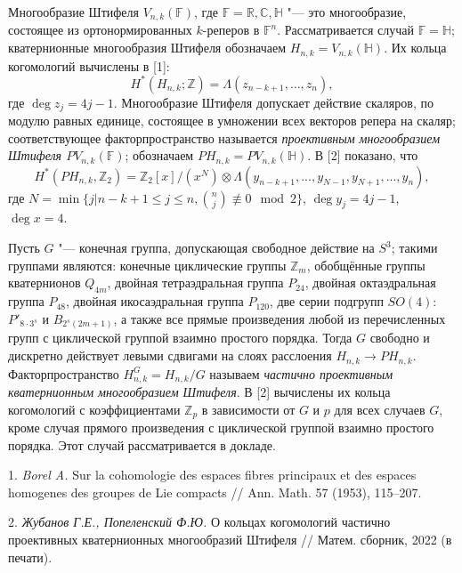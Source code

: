 
\vzmscaption

Многообразие Штифеля $V_{n,k}(\mathbb{F})$, где $\mathbb{F} = \mathbb{R}, \mathbb{C}, \mathbb{H}$ "--- это многообразие, состоящее из ортонормированных $k$-реперов в $\mathbb{F}^n$. Рассматривается случай $\mathbb{F} = \mathbb{H}$; кватернионные многообразия Штифеля обозначаем $H_{n,k} = V_{n,k}(\mathbb{H})$. Их кольца когомологий вычислены в [1]:
$$H^*(H_{n,k}; \mathbb{Z}) = \Lambda(z_{n-k+1}, \ldots, z_n),$$
где $\deg z_j = 4j - 1$. Многообразие Штифеля допускает действие скаляров, по модулю равных единице, состоящее в умножении всех векторов репера на скаляр; соответствующее факторпространство называется \emph{проективным многообразием Штифеля $PV_{n,k}(\mathbb{F})$}; обозначаем $PH_{n,k}=PV_{n,k}(\mathbb{H})$. В [2] показано, что
$$H^*(PH_{n,k}, \mathbb{Z}_2) = \mathbb{Z}_2[x]/(x^N) \otimes \Lambda(y_{n-k+1},..., y_{N-1}, y_{N+1}, ..., y_n),$$
где $N = \min \{j | n - k + 1 \leqslant j \leqslant n, \binom{n}{j} \not\equiv 0 \mod 2\}$, $\deg y_j = 4j - 1$, $\deg x = 4$.

Пусть $G$ "--- конечная группа, допускающая свободное действие на $S^3$; такими группами являются: конечные циклические группы $\mathbb{Z}_m$, обобщённые группы кватернионов $Q_{4m}$, двойная тетраэдральная группа $P_{24}$, двойная октаэдральная группа $P_{48}$, двойная икосаэдральная группа $P_{120}$, две серии подгрупп $SO(4)$: $P'_{8\cdot3^s}$ и $B_{2^s(2m+1)}$, а также все прямые произведения любой из перечисленных групп с циклической группой взаимно простого порядка. Тогда $G$ свободно и дискретно действует левыми сдвигами на слоях расслоения $H_{n,k} \to PH_{n,k}$. Факторпространство $H^G_{n,k} = H_{n,k}/G$ называем \emph{частично проективным кватернионным многообразием Штифеля}. В [2] вычислены их кольца когомологий с коэффициентами $\mathbb{Z}_p$ в зависимости от $G$ и $p$ для всех случаев $G$, кроме случая прямого произведения с циклической группой взаимно простого порядка. Этот случай рассматривается в докладе.


\litlist


1. \emph{Borel A.} Sur la cohomologie des espaces fibres principaux et des espaces homogenes
des groupes de Lie compacts // Ann. Math. 57 (1953), 115–207.


2. \emph{Жубанов Г.Е., Попеленский Ф.Ю.} О кольцах когомологий частично проективных кватернионных многообразий Штифеля // Матем. сборник, 2022 (в печати).

